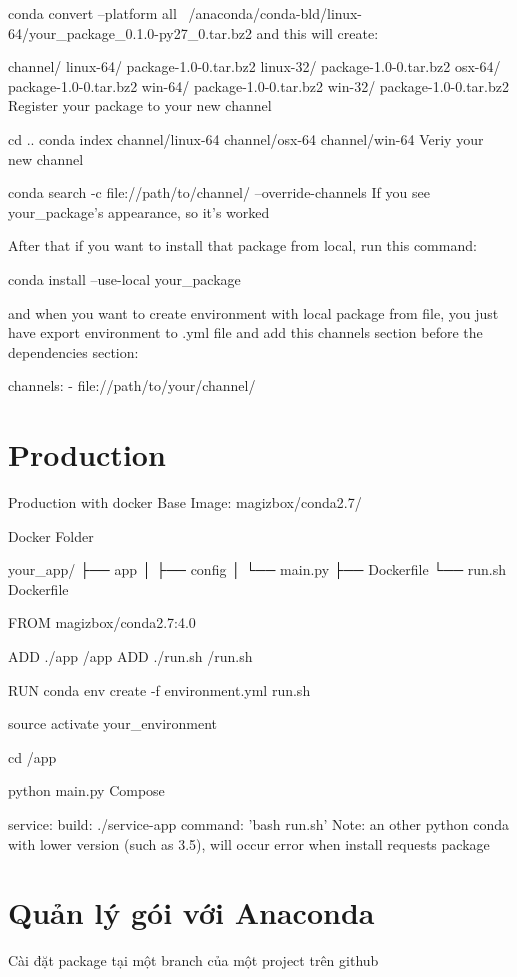 conda convert --platform all ~/anaconda/conda-bld/linux-64/your_package_0.1.0-py27_0.tar.bz2
and this will create:

channel/
linux-64/
   package-1.0-0.tar.bz2
linux-32/
   package-1.0-0.tar.bz2
osx-64/
   package-1.0-0.tar.bz2
win-64/
   package-1.0-0.tar.bz2
win-32/
   package-1.0-0.tar.bz2
Register your package to your new channel

cd ..
conda index channel/linux-64 channel/osx-64 channel/win-64
Veriy your new channel

conda search -c file://path/to/channel/ --override-channels
If you see your_package's appearance, so it's worked

After that if you want to install that package from local, run this command:


conda install --use-local your_package

and when you want to create environment with local package from file, you just have export environment to .yml file and add this channels section before the dependencies section:


channels:
- file://path/to/your/channel/

\section{Production}

Production with docker
Base Image: magizbox/conda2.7/

Docker Folder

your_app/
├── app
│   ├── config
│   └── main.py
├── Dockerfile
└── run.sh
Dockerfile

FROM magizbox/conda2.7:4.0

ADD ./app /app
ADD ./run.sh /run.sh

RUN conda env create -f environment.yml
run.sh

source activate your_environment

cd /app

python main.py
Compose

 service:
  build: ./service-app
  command: 'bash run.sh'
Note: an other python conda with lower version (such as 3.5), will occur error when install requests package

\section{Quản lý gói với Anaconda}

\noindent Cài đặt package tại một branch của một project trên github

